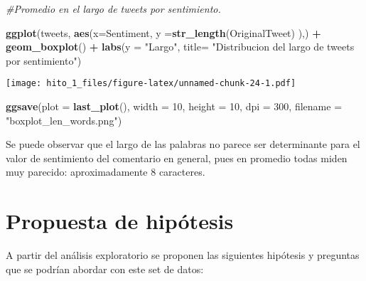 \documentclass[
]{article}
\newenvironment{Shaded}{\begin{snugshade}}{\end{snugshade}}
\newcommand{\CommentTok}[1]{\textcolor[rgb]{0.56,0.35,0.01}{\textit{#1}}}
\newcommand{\DataTypeTok}[1]{\textcolor[rgb]{0.13,0.29,0.53}{#1}}
\newcommand{\DecValTok}[1]{\textcolor[rgb]{0.00,0.00,0.81}{#1}}
\newcommand{\KeywordTok}[1]{\textcolor[rgb]{0.13,0.29,0.53}{\textbf{#1}}}
\newcommand{\NormalTok}[1]{#1}
\newcommand{\OperatorTok}[1]{\textcolor[rgb]{0.81,0.36,0.00}{\textbf{#1}}}
\newcommand{\StringTok}[1]{\textcolor[rgb]{0.31,0.60,0.02}{#1}}
\begin{document}
\begin{Shaded}
\begin{Highlighting}[]
\CommentTok{#Promedio en el largo de tweets por sentimiento.}

\KeywordTok{ggplot}\NormalTok{(tweets, }\KeywordTok{aes}\NormalTok{(}\DataTypeTok{x=}\NormalTok{Sentiment, }\DataTypeTok{y =}\KeywordTok{str_length}\NormalTok{(OriginalTweet) ),) }\OperatorTok{+}\StringTok{ }\KeywordTok{geom_boxplot}\NormalTok{() }\OperatorTok{+}\StringTok{ }\KeywordTok{labs}\NormalTok{(}\DataTypeTok{y =} \StringTok{"Largo"}\NormalTok{, }\DataTypeTok{title=} \StringTok{"Distribucion del largo de tweets por sentimiento"}\NormalTok{)}
\end{Highlighting}
\end{Shaded}

\texttt{[image: hito\_1\_files/figure-latex/unnamed-chunk-24-1.pdf]}

\begin{Shaded}
\begin{Highlighting}[]
\KeywordTok{ggsave}\NormalTok{(}\DataTypeTok{plot =} \KeywordTok{last_plot}\NormalTok{(), }\DataTypeTok{width =} \DecValTok{10}\NormalTok{, }\DataTypeTok{height =} \DecValTok{10}\NormalTok{, }\DataTypeTok{dpi =} \DecValTok{300}\NormalTok{, }\DataTypeTok{filename =} \StringTok{"boxplot_len_words.png"}\NormalTok{)}
\end{Highlighting}
\end{Shaded}

Se puede observar que el largo de las palabras no parece ser
determinante para el valor de sentimiento del comentario en general,
pues en promedio todas miden muy parecido: aproximadamente 8 caracteres.

\hypertarget{propuesta-de-hipuxf3tesis}{%
\section{Propuesta de hipótesis}\label{propuesta-de-hipuxf3tesis}}

A partir del análisis exploratorio se proponen las siguientes hipótesis
y preguntas que se podrían abordar con este set de datos:
\end{document}
